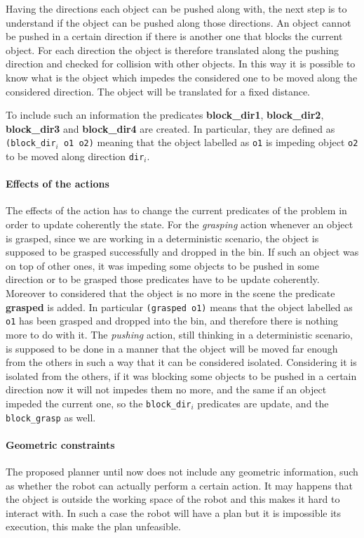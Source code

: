 Having the directions each object can be pushed along with, the next step is to understand if the object can be pushed along those directions. An object cannot be pushed in a certain direction if there is another one that blocks the current object. For each direction the object is therefore translated along the pushing direction and checked for collision with other objects. In this way it is possible to know what is the object which impedes the considered one to be moved along the considered direction. The object will be translated for a fixed distance.

To include such an information the predicates \textbf{block\_dir1}, \textbf{block\_dir2}, \textbf{block\_dir3} and \textbf{block\_dir4} are created. In particular, they are defined as \texttt{(block\_dir}$_i$\texttt{ o1 o2)} meaning that the object labelled as \texttt{o1} is impeding object \texttt{o2} to be moved along direction \texttt{dir}$_i$.

\paragraph{Effects of the actions}
The effects of the action has to change the current predicates of the problem in order to update coherently the state. For the \textit{grasping} action whenever an object is grasped, since we are working in a deterministic scenario, the object is supposed to be grasped successfully and dropped in the bin. If such an object was on top of other ones, it was impeding some objects to be pushed in some direction or to be grasped those predicates have to be update coherently. Moreover to considered that the object is no more in the scene the predicate \textbf{grasped} is added. In particular \texttt{(grasped o1)} means that the object labelled as \texttt{o1} has been grasped and dropped into the bin, and therefore there is nothing more to do with it. The \textit{pushing} action, still thinking in a deterministic scenario, is supposed to be done in a manner that the object will be moved far enough from the others in such a way that it can be considered isolated. Considering it is isolated from the others, if it was blocking some objects to be pushed in a certain direction now it will not impedes them no more, and the same if an object impeded the current one, so the \texttt{block\_dir}$_i$ predicates are update, and the \texttt{block\_grasp} as well.  

	
\paragraph{Geometric constraints}
The proposed planner until now does not include any geometric information, such as whether the robot can actually perform a certain action. It may happens that the object is outside the working space of the robot and this makes it hard to interact with. In such a case the robot will have a plan but it is impossible its execution, this make the plan unfeasible. 

